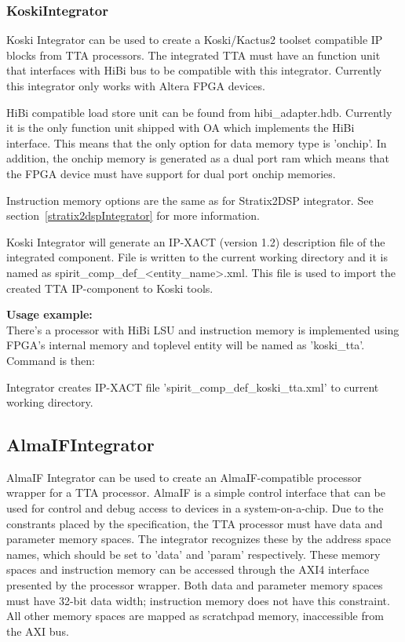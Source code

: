 \documentclass[a4paper,twoside]{tceusermanual}
\begin{document}
\subsubsection{KoskiIntegrator}

Koski Integrator can be used to create a Koski/Kactus2 toolset
compatible IP blocks from TTA processors. The integrated TTA must have
an function unit that interfaces with HiBi bus to be compatible with
this integrator. Currently this integrator only works with Altera
FPGA devices.

HiBi compatible load store unit can be found from hibi\_adapter.hdb. Currently
it is the only function unit shipped with OA which implements the HiBi interface.
This means that the only option for data memory type is 'onchip'. In addition,
the onchip memory is generated as a dual port ram which means that the FPGA
device must have support for dual port onchip memories.

Instruction memory options are the same as for Stratix2DSP integrator. See
section~\ref{stratix2dspIntegrator} for more information.

Koski Integrator will generate an IP-XACT (version 1.2) description file of the
integrated component. File is written to the current working directory and it
is named as spirit\_comp\_def\_<entity\_name>.xml. This file is used to import
the created TTA IP-component to Koski tools.

\textbf{Usage example:} \\
There's a processor with HiBi LSU and instruction memory is implemented using
FPGA's internal memory and toplevel entity will be named as 'koski\_tta'.
Command is then:


Integrator creates IP-XACT file 'spirit\_comp\_def\_koski\_tta.xml' to
current working directory.

\subsection{AlmaIFIntegrator}

AlmaIF Integrator can be used to create an AlmaIF-compatible
processor wrapper for a TTA processor. AlmaIF is a simple control interface
that can be used for control and debug access to devices in a system-on-a-chip.
Due to the constrants placed by the specification, the TTA processor must have
data and parameter memory spaces. The integrator recognizes these by the address
space names, which should be set to 'data' and 'param' respectively. These
memory spaces and instruction memory can be accessed through the AXI4 interface
presented by the processor wrapper. Both data and parameter memory spaces must
have 32-bit data width; instruction memory does not have this constraint. All
other memory spaces are mapped as scratchpad memory, inaccessible from the AXI
bus.
\end{document}
